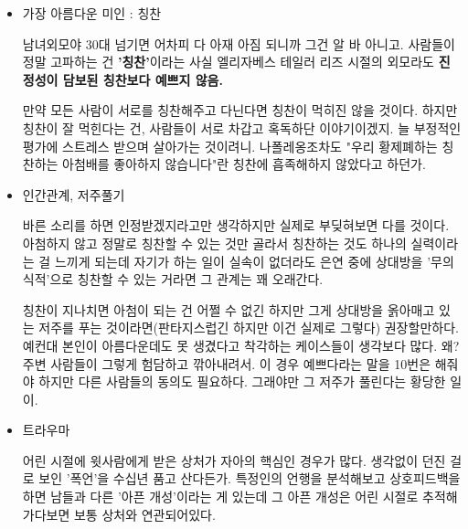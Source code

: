 \vspace{5mm}
\begin{itemize}

    \item 가장 아름다운 미인 : 칭찬
    \vspace{5mm}

    남녀외모야 30대 넘기면 어차피 다 아재 아짐 되니까 그건 알 바 아니고.
    사람들이 정말 고파하는 건 \textbf{'칭찬'}이라는 사실
    엘리자베스 테일러 리즈 시절의 외모라도 \textbf{진정성이 담보된 칭찬보다 예쁘지 않음.}
    \vspace{5mm}

    만약 모든 사람이 서로를 칭찬해주고 다닌다면 칭찬이 먹히진 않을 것이다.
    하지만 칭찬이 잘 먹힌다는 건, 사람들이 서로 차갑고 혹독하단 이야기이겠지. 늘 부정적인 평가에 스트레스 받으며 살아가는 것이려니.
    나폴레옹조차도 "우리 황제폐하는 칭찬하는 아첨배를 좋아하지 않습니다"란 칭찬에 흡족해하지 않았다고 하던가.
    \vspace{5mm}

    \item 인간관계, 저주풀기
    \vspace{5mm}

    바른 소리를 하면 인정받겠지라고만 생각하지만 실제로 부딪혀보면 다를 것이다.
    아첨하지 않고 정말로 칭찬할 수 있는 것만 골라서 칭찬하는 것도 하나의 실력이라는 걸 느끼게 되는데
    자기가 하는 일이 실속이 없더라도 은연 중에 상대방을 '무의식적'으로 칭찬할 수 있는 거라면 그 관계는 꽤 오래간다.
    \vspace{5mm}

    칭찬이 지나치면 아첨이 되는 건 어쩔 수 없긴 하지만
    그게 상대방을 옭아매고 있는 저주를 푸는 것이라면(판타지스럽긴 하지만 이건 실제로 그렇다) 권장할만하다.
    예컨대 본인이 아름다운데도 못 생겼다고 착각하는 케이스들이 생각보다 많다. 왜? 주변 사람들이 그렇게 험담하고 깎아내려서.
    이 경우 예쁘다라는 말을 10번은 해줘야 하지만 다른 사람들의 동의도 필요하다. 그래야만 그 저주가 풀린다는 황당한 일이.
    \vspace{5mm}

    \item 트라우마
    \vspace{5mm}

    어린 시절에 윗사람에게 받은 상처가 자아의 핵심인 경우가 많다. 생각없이 던진 걸로 보인 '폭언'을 수십년 품고 산다든가.
    특정인의 언행을 분석해보고 상호피드백을 하면 남들과 다른 '아픈 개성'이라는 게 있는데
    그 아픈 개성은 어린 시절로 추적해 가다보면 보통 상처와 연관되어있다.
    \vspace{5mm}


\end{itemize}
